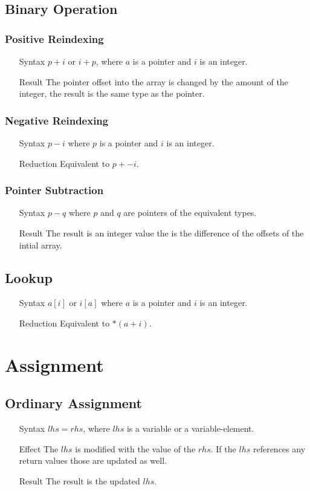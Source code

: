 \subsection{Binary Operation}
\subsubsection{Positive Reindexing}
\begin{itemize}
\item[Syntax] $p + i$ or $i + p$, where $a$ is a pointer and $i$ is an integer.
\item[Result] The pointer offset into the array is changed by the amount of the integer, the result is the same type as the pointer.
\end{itemize}
\subsubsection{Negative Reindexing}
\begin{itemize}
\item[Syntax] $p - i$ where $p$ is a pointer and $i$ is an integer.
\item[Reduction] Equivalent to $p + -i$.
\end{itemize}
\subsubsection{Pointer Subtraction}
\begin{itemize}
\item[Syntax] $p - q$ where $p$ and $q$ are pointers of the equivalent types.
\item[Result] The result is an integer value the is the difference of the offsets of the intial array.
\end{itemize}
\subsection{Lookup}
\begin{itemize}
\item[Syntax] $a[i]$ or $i[a]$ where $a$ is a pointer and $i$ is an integer.
\item[Reduction] Equivalent to $*\left(a + i\right)$.
\end{itemize}
\section{Assignment}
\subsection{Ordinary Assignment}
\begin{itemize}
\item[Syntax] $lhs = rhs$, where $lhs$ is a variable or a variable-element.
\item[Effect] The $lhs$ is modified with the value of the $rhs$. If the $lhs$ references any return values those are updated as well.
\item[Result] The result is the updated $lhs$.
\end{itemize}
